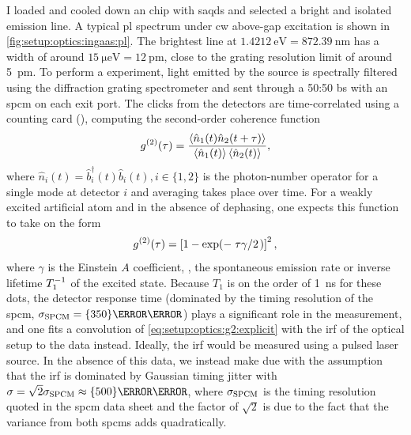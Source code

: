 I loaded and cooled down an  chip with \glspl{saqd} and selected a bright and isolated emission line.
A typical \gls{pl} spectrum under \gls{cw} above-gap excitation is shown in \cref{fig:setup:optics:ingaas:pl}.
The brightest line at $\qty{1.4212}{\eV} = \qty{872.39}{\nano\meter}$ has a width of around $\qty{15}{\micro\eV} = \qty{12}{\pico\meter}$, close to the grating
resolution limit of around \qty{5}{pm}.
To perform a  experiment, light emitted by the source is spectrally filtered using the \thespectrometer diffraction grating spectrometer and sent through a 50:50 \gls{bs} with an \thespcm \gls{spcm} on each exit port.
The clicks from the detectors are time-correlated using a counting card (\tagger), computing the second-order coherence function~\cite{Kimble1976,Walls1979,Cohen-Tannoudji1998}
\begin{equation}
    g^{(2)}(\tau) = \frac{\expval{\hat{n}_1(t)\hat{n}_2(t + \tau)}}{\expval{\hat{n}_1(t)}\expval{\hat{n}_2(t)}},
\end{equation}
where $\hat{n}_i(t) = \hat{b}^\dagger_i(t) \hat{b}_i(t), i\in\lbrace 1,2\rbrace$ is the photon-number operator for a single mode at detector $i$ and averaging takes place over time.
For a weakly excited artificial atom and in the absence of dephasing, one expects this function to take on the form~\cite{Walls1979,Loudon2000,Grandi2016}
\begin{equation}\label{eq:setup:optics:g2:explicit}
    \g{2}(\tau) = \left[1 - \exp(-\flatfrac{\tau\gamma}{2})\right]^2,
\end{equation}
where $\gamma$ is the Einstein $A$ coefficient, \ie, the spontaneous emission rate or inverse lifetime $T_1^{-1}$ of the excited state.
Because $T_1$ is on the order of \qty{1}{\nano\second} for these dots, the detector response time (dominated by the timing resolution of the \gls{spcm}, $\sigma_{\mr{SPCM}} = \qty{350}{\pico\second}$) plays a significant role in the measurement, and one fits a convolution of \cref{eq:setup:optics:g2:explicit} with the \gls{irf} of the optical setup to the data instead.
Ideally, the \gls{irf} would be measured using a pulsed laser source.
In the absence of this data, we instead make due with the assumption that the \gls{irf} is dominated by Gaussian timing jitter with $\sigma = \sqrt{2}\sigma_{\mr{SPCM}} \approx \qty{500}{\pico\second}$, where $\sigma_{\mathrm{SPCM}}$ is the timing resolution quoted in the \gls{spcm} data sheet and the factor of $\sqrt{2}$ is due to the fact that the variance from both \glspl{spcm} adds quadratically.
